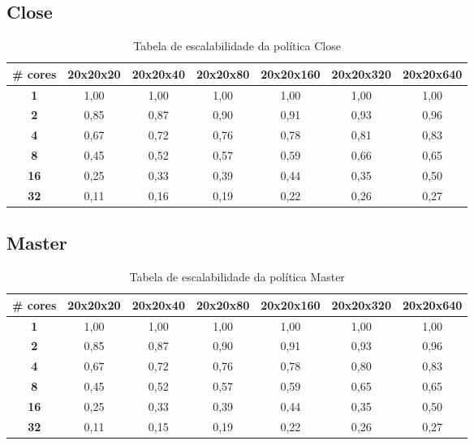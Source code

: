 \documentclass[a4paper, 12pt]{article}
\begin{document}
	\subsection{Close}
	\begin{table}[htbp]
		\centering
		\begin{tabular}{|c|c|c|c|c|c|c|}
			\hline
			\textbf{\# cores} & \textbf{20x20x20} & \textbf{20x20x40} & \textbf{20x20x80} & \textbf{20x20x160} & \textbf{20x20x320} & \textbf{20x20x640} \\
			\hline
			\textbf{1} & 1,00 & 1,00 & 1,00 & 1,00 & 1,00 & 1,00 \\
			\hline
			\textbf{2} & 0,85 & 0,87 & 0,90 & 0,91 & 0,93 & 0,96 \\
			\hline
			\textbf{4} & 0,67 & 0,72 & 0,76 & 0,78 & 0,81 & 0,83 \\
			\hline
			\textbf{8} & 0,45 & 0,52 & 0,57 & 0,59 & 0,66 & 0,65 \\
			\hline
			\textbf{16} & 0,25 & 0,33 & 0,39 & 0,44 & 0,35 & 0,50 \\
			\hline
			\textbf{32} & 0,11 & 0,16 & 0,19 & 0,22 & 0,26 & 0,27 \\
			\hline
		\end{tabular}
		\caption{Tabela de escalabilidade da política Close}
	\end{table}
	
	\vspace{5cm}
	
	\subsection{Master}
	\begin{table}[htbp]
		\centering
		\begin{tabular}{|c|c|c|c|c|c|c|}
			\hline
			\textbf{\# cores} & \textbf{20x20x20} & \textbf{20x20x40} & \textbf{20x20x80} & \textbf{20x20x160} & \textbf{20x20x320} & \textbf{20x20x640} \\
			\hline
			\textbf{1} & 1,00 & 1,00 & 1,00 & 1,00 & 1,00 & 1,00 \\
			\hline
			\textbf{2} & 0,85 & 0,87 & 0,90 & 0,91 & 0,93 & 0,96 \\
			\hline
			\textbf{4} & 0,67 & 0,72 & 0,76 & 0,78 & 0,80 & 0,83 \\
			\hline
			\textbf{8} & 0,45 & 0,52 & 0,57 & 0,59 & 0,65 & 0,65 \\
			\hline
			\textbf{16} & 0,25 & 0,33 & 0,39 & 0,44 & 0,35 & 0,50 \\
			\hline
			\textbf{32} & 0,11 & 0,15 & 0,19 & 0,22 & 0,26 & 0,27 \\
			\hline
		\end{tabular}
		\caption{Tabela de escalabilidade da política Master}
	\end{table}

	
	
	

	 
\end{document}
